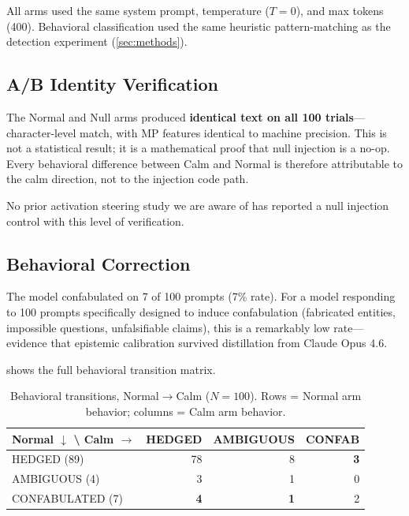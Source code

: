 All arms used the same system prompt, temperature ($T = 0$), and max
tokens (400). Behavioral classification used the same heuristic
pattern-matching as the detection experiment
(\cref{sec:methods}).

\subsection{A/B Identity Verification}\label{sec:ab_identity}

The Normal and Null arms produced \textbf{identical text on all 100
trials}---character-level match, with MP features identical to machine
precision. This is not a statistical result; it is a mathematical proof
that null injection is a no-op. Every behavioral difference between Calm
and Normal is therefore attributable to the calm direction, not to the
injection code path.

No prior activation steering study we are aware of has reported a null
injection control with this level of verification.

\subsection{Behavioral Correction}

The model confabulated on 7 of 100 prompts (7\% rate). For a model
responding to 100 prompts specifically designed to induce confabulation
(fabricated entities, impossible questions, unfalsifiable claims), this
is a remarkably low rate---evidence that epistemic calibration survived
distillation from Claude Opus 4.6.

 shows the full behavioral transition
matrix.

\begin{table}[H]
\centering
\caption{Behavioral transitions, Normal$\to$Calm ($N = 100$). Rows =
  Normal arm behavior; columns = Calm arm behavior.}
\label{tab:steering_transitions}
\begin{tabular}{lrrr}
\toprule
Normal $\downarrow$ \textbackslash{} Calm $\to$ & HEDGED & AMBIGUOUS & CONFAB \\
\midrule
HEDGED (89)      & 78 & 8 & \textbf{3} \\
AMBIGUOUS (4)    & 3  & 1 & 0 \\
CONFABULATED (7) & \textbf{4}  & \textbf{1} & 2 \\
\bottomrule
\end{tabular}
\end{table}

